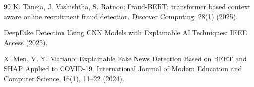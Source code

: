 \documentclass[runningheads]{llncs}
\begin{document}
\begin{thebibliography}{99}
K. Taneja, J. Vashishtha, S. Ratnoo: Fraud-BERT: transformer based context aware online recruitment fraud detection. Discover Computing, 28(1) (2025). 

DeepFake Detection Using CNN Models with Explainable AI Techniques: IEEE Access (2025). 

X. Men, V. Y. Mariano: Explainable Fake News Detection Based on BERT and SHAP Applied to COVID-19. International Journal of Modern Education and Computer Science, 16(1), 11–22 (2024). 

\end{thebibliography}
\end{document}
